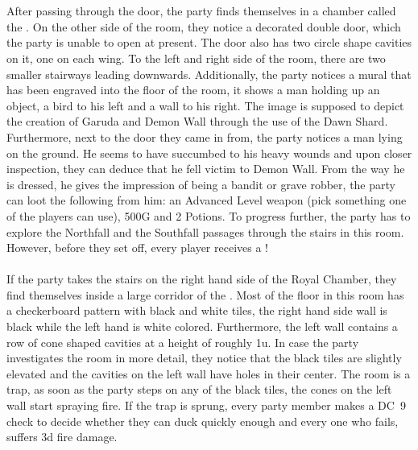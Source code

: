 %
\vfill
%
\\\\
%
After passing through the door, the party finds themselves in a chamber called the .
On the other side of the room, they notice a decorated double door, which the party is unable to open at present.
The door also has two circle shape cavities on it, one on each wing. 
To the left and right side of the room, there are two smaller stairways leading downwards.
Additionally, the party notices a mural that has been engraved into the floor of the room, it shows a man holding up an object, a bird to his left and a wall to his right.
The image is supposed to depict the creation of Garuda and Demon Wall through the use of the Dawn Shard.
Furthermore, next to the door they came in from, the party notices a man lying on the ground.
He seems to have succumbed to his heavy wounds and upon closer inspection, they can deduce that he fell victim to Demon Wall.
From the way he is dressed, he gives the impression of being a bandit or grave robber, the party can loot the following from him:
an Advanced Level weapon (pick something one of the players can use), 500G and 2 Potions.
To progress further, the party has to explore the Northfall and the Southfall passages through the stairs in this room. 
However, before they set off, every player receives a !
%
%
\clearpage
%
\\\\
%
If the party takes the stairs on the right hand side of the Royal Chamber, they find themselves inside a large corridor of the .
Most of the floor in this room has a checkerboard pattern with black and white tiles, the right hand side wall is black while the left hand is white colored.
Furthermore, the left wall contains a row of cone shaped cavities at a height of roughly 1u.
In case the party investigates the room in more detail, they notice that the black tiles are slightly elevated and the cavities on the left wall have holes in their center.
The room is a trap, as soon as the party steps on any of the black tiles, the cones on the left wall start spraying fire.
If the trap is sprung, every party member makes a DC~9 check to decide whether they can duck quickly enough and every one who fails, suffers 3d fire damage.
